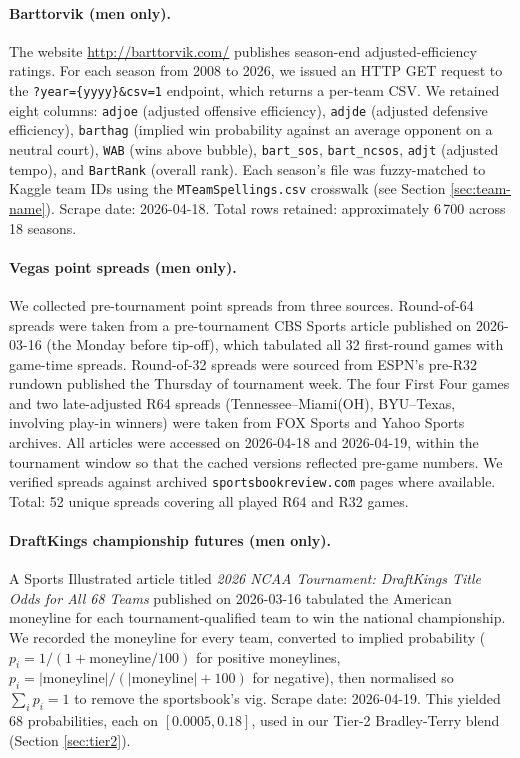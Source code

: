 \documentclass[11pt, a4paper]{article}
\begin{document}
\paragraph{Barttorvik (men only).}
The website \url{http://barttorvik.com/} publishes season-end adjusted-efficiency ratings. For each season from 2008 to 2026, we issued an HTTP GET request to the \texttt{?year=\{yyyy\}\&csv=1} endpoint, which returns a per-team CSV. We retained eight columns: \texttt{adjoe} (adjusted offensive efficiency), \texttt{adjde} (adjusted defensive efficiency), \texttt{barthag} (implied win probability against an average opponent on a neutral court), \texttt{WAB} (wins above bubble), \texttt{bart\_sos}, \texttt{bart\_ncsos}, \texttt{adjt} (adjusted tempo), and \texttt{BartRank} (overall rank). Each season's file was fuzzy-matched to Kaggle team IDs using the \texttt{MTeamSpellings.csv} crosswalk (see Section \ref{sec:team-name}). Scrape date: 2026-04-18. Total rows retained: approximately 6\,700 across 18 seasons.

\paragraph{Vegas point spreads (men only).}
We collected pre-tournament point spreads from three sources. Round-of-64 spreads were taken from a pre-tournament CBS Sports article published on 2026-03-16 (the Monday before tip-off), which tabulated all 32 first-round games with game-time spreads. Round-of-32 spreads were sourced from ESPN's pre-R32 rundown published the Thursday of tournament week. The four First Four games and two late-adjusted R64 spreads (Tennessee--Miami(OH), BYU--Texas, involving play-in winners) were taken from FOX Sports and Yahoo Sports archives. All articles were accessed on 2026-04-18 and 2026-04-19, within the tournament window so that the cached versions reflected pre-game numbers. We verified spreads against archived \texttt{sportsbookreview.com} pages where available. Total: 52 unique spreads covering all played R64 and R32 games.

\paragraph{DraftKings championship futures (men only).}
A Sports Illustrated article titled \emph{2026 NCAA Tournament: DraftKings Title Odds for All 68 Teams} published on 2026-03-16 tabulated the American moneyline for each tournament-qualified team to win the national championship. We recorded the moneyline for every team, converted to implied probability ($p_i = 1 / (1 + \text{moneyline}/100)$ for positive moneylines, $p_i = |\text{moneyline}| / (|\text{moneyline}| + 100)$ for negative), then normalised so $\sum_i p_i = 1$ to remove the sportsbook's vig. Scrape date: 2026-04-19. This yielded 68 probabilities, each on $[0.0005, 0.18]$, used in our Tier-2 Bradley-Terry blend (Section \ref{sec:tier2}).
\end{document}
